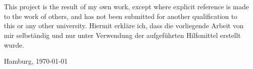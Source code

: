 \section*{}  
\thispagestyle{empty}           %
{
\setlength{\parindent}{0mm}		 		 %
%
{This project is the result of my own work, except where explicit reference is made to the work of others, and has not been submitted
for another qualification to this or any other university.}%
{Hiermit erkläre ich, dass die vorliegende Arbeit von mir selbständig und nur 
unter Verwendung der aufgeführten Hilfsmittel erstellt wurde.}

\vspace{2cm}

Hamburg, \today
} %
\newpage

